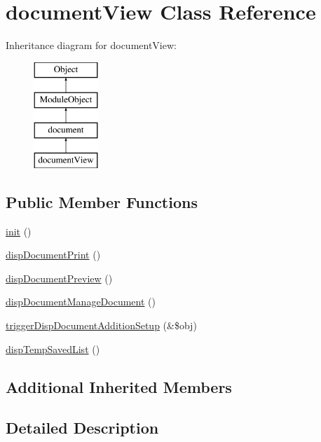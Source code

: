 \hypertarget{classdocumentView}{\section{document\+View Class Reference}
\label{classdocumentView}
}
Inheritance diagram for document\+View\+:\begin{figure}[H]
\begin{center}
\leavevmode
\includegraphics[height=4.000000cm]{classdocumentView}
\end{center}
\end{figure}
\subsection*{Public Member Functions}
\begin{DoxyCompactItemize}
\item 
\hyperlink{classdocumentView_a198da8ed86ff84d45687f2783113b799}{init} ()
\item 
\hyperlink{classdocumentView_aab058bbbfedaeb2d9b6bb1505d5e3b9c}{disp\+Document\+Print} ()
\item 
\hyperlink{classdocumentView_af93051602dbf3254f05d1d0ada402907}{disp\+Document\+Preview} ()
\item 
\hyperlink{classdocumentView_a5a358d7106e98e64179115b3966639de}{disp\+Document\+Manage\+Document} ()
\item 
\hyperlink{classdocumentView_a0ea8992b5f032e29e528cbb9ab1b709c}{trigger\+Disp\+Document\+Addition\+Setup} (\&\$obj)
\item 
\hyperlink{classdocumentView_a849d0bdc714a0ea2fd23bbe86f2fde6f}{disp\+Temp\+Saved\+List} ()
\end{DoxyCompactItemize}
\subsection*{Additional Inherited Members}


\subsection{Detailed Description}


